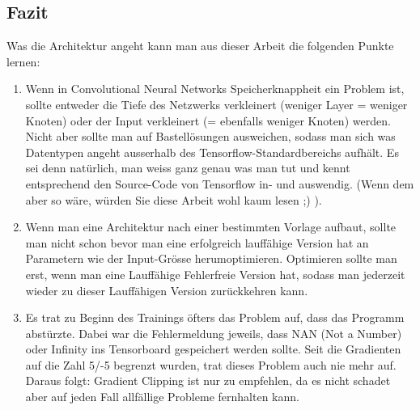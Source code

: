 \subsection{Fazit}
Was die Architektur angeht kann man aus dieser Arbeit die folgenden Punkte lernen:
\begin{enumerate}
\item Wenn in Convolutional Neural Networks Speicherknappheit ein Problem ist, sollte entweder die Tiefe des Netzwerks verkleinert (weniger Layer = weniger Knoten) oder der Input verkleinert (= ebenfalls weniger Knoten) werden. 
Nicht aber sollte man auf Bastellösungen ausweichen, sodass man sich was Datentypen angeht ausserhalb des Tensorflow-Standardbereichs aufhält. 
Es sei denn natürlich, man weiss ganz genau was man tut und kennt entsprechend den Source-Code von Tensorflow in- und auswendig. 
(Wenn dem aber so wäre, würden Sie diese Arbeit wohl kaum lesen ;) ).
\item Wenn man eine Architektur nach einer bestimmten Vorlage aufbaut, sollte man nicht schon bevor man eine erfolgreich lauffähige Version hat an Parametern wie der Input-Grösse herumoptimieren. 
Optimieren sollte man erst, wenn man eine Lauffähige Fehlerfreie Version hat, sodass man jederzeit wieder zu dieser Lauffähigen Version zurückkehren kann.
\item Es trat zu Beginn des Trainings öfters das Problem auf, dass das Programm abstürzte.
Dabei war die Fehlermeldung jeweils, dass \grqq{}NAN\grqq{} (Not a Number) oder \grqq{}Infinity\grqq{} ins Tensorboard gespeichert werden sollte.
Seit die Gradienten auf die Zahl 5/-5 begrenzt wurden, trat dieses Problem auch nie mehr auf.
Daraus folgt: Gradient Clipping ist nur zu empfehlen, da es nicht schadet aber auf jeden Fall allfällige Probleme fernhalten kann. 
\end{enumerate}




